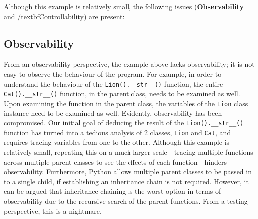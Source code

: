 \documentclass{article}
\begin{document}
%

Although this example is relatively small, the following issues
(\textbf{Observability} and /textbf{Controllability}) are present:

\subsection{Observability}

From an observability perspective, the example above lacks
observability; it is not easy to observe the behaviour of the program.
For example, in order to understand the behaviour of the
\texttt{Lion().\_\_str\_\_()} function, the entire
\texttt{Cat().\_\_str\_\_()} function, in the parent class, needs to
be examined as well. Upon examining the function in the parent class,
the variables of the \texttt{Lion} class instance need to be examined
as well. Evidently, observability has been compromised. Our initial
goal of deducing the result of the \texttt{Lion().\_\_str\_\_()}
function has turned into a tedious analysis of 2 classes,
\texttt{Lion} and \texttt{Cat}, and requires tracing variables from
one to the other. Although this example is relatively small, repeating
this on a much larger scale - tracing multiple functions across
multiple parent classes to see the effects of each function - hinders
observability. Furthermore, Python allows multiple parent classes to
be passed in to a single child, if establishing an inheritance chain
is not required. However, it can be argued that inheritance chaining
is the worst option in terms of observability due to the recursive
search of the parent functions. From a testing perspective, this is a
nightmare.
\end{document}

